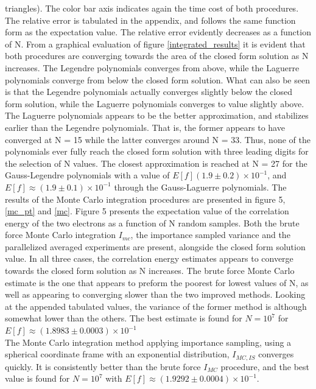 \documentclass[%
reprint,
amsmath,amssymb,
aps,
]{revtex4-1}
\begin{document}
\noindent 
triangles). The color bar axis indicates again the time cost of both procedures.  \\ \indent The relative error is tabulated in the appendix, and follows the same function form as the expectation value. The relative error evidently decreases as a function of N. From a graphical evaluation of figure \ref{integrated_results} it is evident that both procedures are converging towards the area of the closed form solution as N increases. The Legendre polynomials converges from above, while the Laguerre polynomials converge from below the closed form solution. What can also be seen is that the Legendre polynomials actually converges slightly below the closed form solution, while the Laguerre polynomials converges to value slightly above. The Laguerre polynomials appears to be the better approximation, and stabilizes earlier than the Legendre polynomials. That is, the former appears to have converged at N = 15 while the latter converges around N = 33. Thus, none of the polynomials ever fully reach the closed form solution with three leading digits for the selection of N values. The closest approximation is reached at N = 27 for the Gauss-Legendre polynomials with a value of $E[f] (1.9 \pm 0.2)\times 10^{-1}$, and $E[f]\approx (1.9 \pm 0.1)\times 10^{-1}$ through the Gauss-Laguerre polynomials. \newpage  \noindent 
The results of the Monte Carlo integration procedures are presented in figure 5, \ref{mc_pt} and \ref{mc}. Figure 5 presents the expectation value of the correlation energy of the two electrons as a function of N random samples. Both the brute force Monte Carlo integration $I_{mc}$, the importance sampled variance and the parallelized averaged experiments are present, alongside the closed form solution value. In all three cases, the correlation energy estimates appears to converge towards the closed form solution as N increases. The brute force Monte Carlo estimate is the one that appears to preform the poorest for lowest values of N, as well as appearing to converging slower than the two improved methods. Looking at the appended tabulated values, the variance of the former method is although somewhat lower than the others. The best estimate is found for $N=10^7$ for $E[f]\approx (1.8983 \pm 0.0003)\times 10^{-1}$ \\ \indent 
The Monte Carlo integration method applying importance sampling, using a spherical coordinate frame with an exponential distribution, $I_{MC,IS}$ converges quickly. It is consistently better than the brute force $I_{MC}$ procedure, and the best value is found for $N = 10^7$ with $E[f]\approx (1.9292 \pm 0.0004)\times 10^{-1}$. \\
\end{document}
